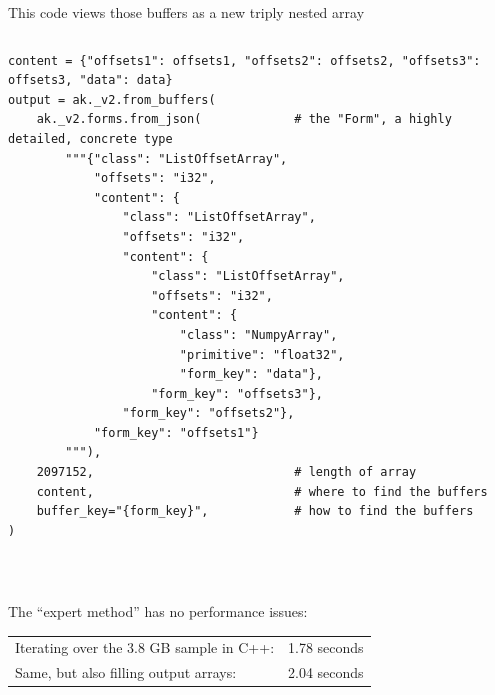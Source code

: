 \documentclass[aspectratio=169]{beamer}
\begin{document}
\begin{frame}[fragile]{This code views those buffers as a new triply nested array}
\vspace{0.1 cm}
\begin{columns}
\scriptsize
\begin{verbatim}
content = {"offsets1": offsets1, "offsets2": offsets2, "offsets3": offsets3, "data": data}
output = ak._v2.from_buffers(
    ak._v2.forms.from_json(             # the "Form", a highly detailed, concrete type
        """{"class": "ListOffsetArray",
            "offsets": "i32",
            "content": {
                "class": "ListOffsetArray",
                "offsets": "i32",
                "content": {
                    "class": "ListOffsetArray",
                    "offsets": "i32",
                    "content": {
                        "class": "NumpyArray",
                        "primitive": "float32",
                        "form_key": "data"},
                    "form_key": "offsets3"},
                "form_key": "offsets2"},
            "form_key": "offsets1"}
        """),
    2097152,                            # length of array
    content,                            # where to find the buffers
    buffer_key="{form_key}",            # how to find the buffers
)
\end{verbatim}
\end{columns}
\end{frame}

\begin{frame}{\mbox{ }}
\Large

The ``expert method'' has no performance issues:

\vspace{0.25 cm}
\renewcommand{\arraystretch}{1.25}
\begin{tabular}{l l}
Iterating over the 3.8 GB sample in C++: & 1.78 seconds \\
Same, but also filling output arrays: & 2.04 seconds \\
\end{tabular}


\end{frame}
\end{document}
